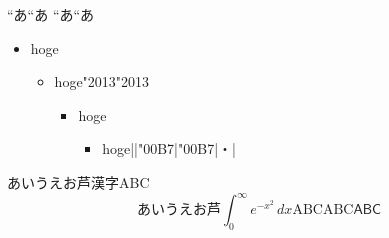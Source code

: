 \documentclass{article}
\begin{document}
{\tracingall\let\char=\ltjalchar\textquotedblleft}あ\textquotedblleft あ%
{\let\char=\ltjjachar\textquotedblleft}あ“あ

\begin{itemize}
\item hoge
\begin{itemize}
\item hoge\textendash\ltjjachar"2013\ltjalchar"2013
\begin{itemize}
\item hoge
\begin{itemize}
\item hoge|\textperiodcentered|\ltjjachar"00B7|\ltjalchar"00B7|・|
\end{itemize}
\end{itemize}
\end{itemize}
\end{itemize}

あいうえお芦漢字ABC
\[
あいうえお芦\int_0^∞ e^{-x^2}\,dx\mathrm{ABC}\textrm{ABC}\textsf{ABC}
\]
\end{document}

